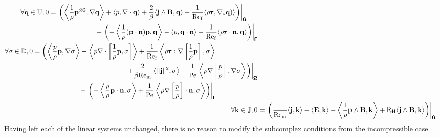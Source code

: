    \begin{align}
        \begin{split}
            \forall \mathbf{q} \in \mathbb{U},  0  &=  \left.\left(\left\langle\frac{1}{\rho}\mathbf{p}^{\otimes 2}, \nabla\mathbf{q}\right\rangle + \langle p, \nabla\cdot\mathbf{q}\rangle + \frac{2}{\beta}\langle\mathbf{j}\wedge\mathbf{B}, \mathbf{q}\rangle - \frac{1}{\mathrm{Re}_{\mathrm{f}}}\langle\rho\pmb{\mathsf{\tau}}, \nabla_{s}\mathbf{q})\rangle\right)\right|_{\pmb{\mathsf{\Omega}}}  \\
            &\;\;\;\;\;\;\;\;\;\;\;\;\;\;\;\;\;\;\;\;\;\;\;\;  + \left.\left(- \left\langle\frac{1}{\rho}(\mathbf{p}\cdot\mathbf{n})\mathbf{p}, \mathbf{q}\right\rangle - \langle p, \mathbf{q}\cdot\mathbf{n}\rangle + \frac{1}{\mathrm{Re}_{\mathrm{f}}}\langle\rho\pmb{\mathsf{\tau}}\cdot\mathbf{n}, \mathbf{q}\rangle\right)\right|_{\pmb{\mathsf{\Gamma}}}
        \end{split}  \\
        \begin{split}
            \forall \sigma \in \mathbb{D},  0  &=  \left(\left\langle\frac{p}{\rho}\mathbf{p}, \nabla\sigma\right\rangle - \left\langle p\nabla\cdot\left[\frac{1}{\rho}{\mathbf{p}}, \sigma\right]\right\rangle + \frac{1}{\mathrm{Re}_{\mathrm{f}}}\left\langle\rho\pmb{\mathsf{\tau}}:\nabla\left[\frac{1}{\rho}\mathbf{p}\right], \sigma\right\rangle\right.  \\
            &\;\;\;\;\;\;\;\;\;\;\;\;\;\;\;\;\;\;\;\;\;\;\;\;\;\;\;\;\;\;\;\;\;\;\;\;\;\;\;\;\;\;\;\;\;\;\;\;\left.\left.+ \frac{2}{\beta\mathrm{Re}_{\mathrm{m}}}\left\langle\|\mathbf{j}\|^{2}, \sigma\right\rangle - \frac{1}{\mathrm{Pe}}\left\langle\rho\nabla\left[\frac{p}{\rho}\right], \nabla\sigma\right\rangle\right)\right|_{\pmb{\mathsf{\Omega}}}  \\
            &\;\;\;\;\;\;\;\;\;\;\;\;\;\;\;\;\;\;\;\;\;\;\;\;  + \left.\left(- \left\langle\frac{p}{\rho}\mathbf{p}\cdot\mathbf{n}, \sigma\right\rangle + \frac{1}{\mathrm{Pe}}\left\langle\rho\nabla\left[\frac{p}{\rho}\right]\cdot\mathbf{n}, \sigma\right\rangle\right)\right|_{\pmb{\mathsf{\Gamma}}}
        \end{split}  \\
        \forall \mathbf{k} \in \mathbb{J},  0  &=  \left.\left(\frac{1}{\mathrm{Re}_{\mathrm{m}}}\langle\mathbf{j}, \mathbf{k}\rangle - \langle\mathbf{E}, \mathbf{k}\rangle - \left\langle\frac{1}{\rho}\mathbf{p}\wedge\mathbf{B}, \mathbf{k}\right\rangle + \mathrm{R}_{\mathrm{H}}\langle\mathbf{j}\wedge\mathbf{B}, \mathbf{k}\rangle\right)\right|_{\pmb{\mathsf{\Omega}}}
    \end{align}
    Having left each of the linear systems unchanged, there is no reason to modify the subcomplex conditions from the incompressible case.
